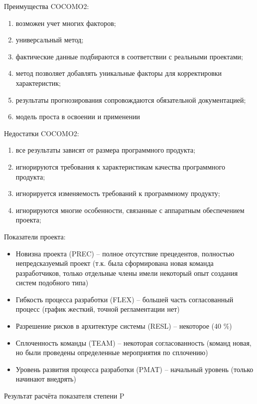 Преимущества COCOMO2:

\begin{enumerate}
	\item возможен учет многих факторов;
	\item универсальный метод;
	\item фактические данные подбираются в соответствии с реальными проектами;
	\item метод позволяет добавлять уникальные факторы для корректировки характеристик;
	\item результаты прогнозирования сопровождаются обязательной документацией;
	\item модель проста в освоении и применении
\end{enumerate}

Недостатки COCOMO2:

\begin{enumerate}
	\item все результаты зависят от размера программного продукта;
	\item игнорируются требования к характеристикам качества программного продукта;
	\item игнорируется изменяемость требований к программному продукту;
	\item игнорируются многие особенности, связанные с аппаратным обеспечением проекта;
\end{enumerate}

Показатели проекта:

\begin{itemize}
	\item Новизна проекта (PREC) – полное отсутствие прецедентов, полностью непредсказуемый проект (т.к. была сформирована новая команда разработчиков, только отдельные члены имели некоторый опыт создания систем подобного типа)
	\item Гибкость процесса разработки (FLEX) – большей часть согласованный процесс (график жесткий, точной регламентации нет)
	\item Разрешение рисков в архитектуре системы (RESL) – некоторое (40 \%)
	\item Сплоченность команды (TEAM) – некоторая согласованность (команд новая, но были проведены определенные мероприятия по сплочению)
	\item Уровень развития процесса разработки (PMAT) – начальный уровень (только начинают внедрять)
\end{itemize}

Результат расчёта показателя степени P


